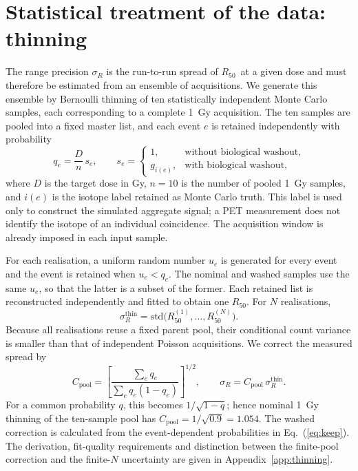 \documentclass[11pt]{article}
\newcommand{\Rc}{\ensuremath{R_{50}}}
\begin{document}
\section{Statistical treatment of the data: thinning}
\label{sec:thinning}

The range precision $\sigma_R$ is the run-to-run spread of \Rc\ at a given
dose and must therefore be estimated from an ensemble of acquisitions. We
generate this ensemble by Bernoulli thinning of ten statistically independent
Monte Carlo samples, each corresponding to a complete \SI{1}{\gray}
acquisition. The ten samples are pooled into a fixed master list,
and each event $e$ is retained independently with probability
%
\begin{equation}
  q_e = \frac{D}{n}\,s_e, \qquad
  s_e =
  \begin{cases}
    1, & \text{without biological washout},\\
    g_{i(e)}, & \text{with biological washout},
  \end{cases}
  \label{eq:keep}
\end{equation}
%
where $D$ is the target dose in Gy, $n=10$ is the number of pooled
\SI{1}{\gray} samples, and $i(e)$ is the isotope label retained as Monte Carlo
truth. This label is used only to construct the simulated aggregate signal; a
PET measurement does not identify the isotope of an individual coincidence.
The acquisition window is already imposed in each input sample.

For each realisation, a uniform random number $u_e$ is generated for every
event and the event is retained when $u_e<q_e$. The nominal and washed samples
use the same $u_e$, so that the latter is a subset of the former. Each retained
list is reconstructed independently and fitted to obtain one \Rc. For $N$
realisations,
%
\begin{equation}
  \sigma_R^{\mathrm{thin}}
  = \mathrm{std}\bigl(R_{50}^{(1)},\ldots,R_{50}^{(N)}\bigr).
  \label{eq:sigmaR}
\end{equation}
%
Because all realisations reuse a fixed parent pool, their conditional count
variance is smaller than that of independent Poisson acquisitions. We correct
the measured spread by
%
\begin{equation}
 C_{\mathrm{pool}} =
 \left[\frac{\sum_e q_e}{\sum_e q_e(1-q_e)}\right]^{1/2},
 \qquad
 \sigma_R=C_{\mathrm{pool}}\,\sigma_R^{\mathrm{thin}}.
 \label{eq:poolcorrection}
\end{equation}
%
For a common probability $q$, this becomes $1/\sqrt{1-q}$; hence nominal
\SI{1}{\gray} thinning of the ten-sample pool has
$C_{\mathrm{pool}}=1/\sqrt{0.9}=1.054$. The washed correction is calculated
from the event-dependent probabilities in Eq.~(\ref{eq:keep}). The derivation,
fit-quality requirements and distinction between the finite-pool correction
and the finite-$N$ uncertainty are given in Appendix~\ref{app:thinning}.
\end{document}
